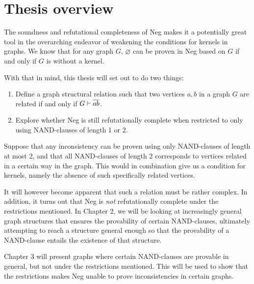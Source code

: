 \section{Thesis overview}
\label{sec:Thesis overview}
The soundness and refutational completeness of Neg makes it a potentially great tool in the overarching endeavor of weakening the conditions for kernels in graphs.
We know that for any graph $G$, $\varnothing$ can be proven in Neg based on $G$ if and only if $G$ is without a kernel.

With that in mind, this thesis will set out to do two things:
\begin{enumerate}
  \item Define a graph structural relation such that two vertices $a,b$ in a graph $G$ are related if and only if $G \vdash \ol{ab}$.
  \item Explore whether Neg is still refutationally complete when restricted to only using NAND-clauses of length 1 or 2.
\end{enumerate}
Suppose that any inconsistency can be proven using only NAND-clauses of length at most 2, and that all NAND-clauses of length 2 corresponds to vertices related in a certain way in the graph.
This would in combination give us a condition for kernels, namely the absence of such specifically related vertices.

It will however become apparent that such a relation must be rather complex.
In addition, it turns out that Neg is \textit{not} refutationally complete under the restrictions mentioned.
\label{sub:Thesis Overview}
In Chapter 2, we will be looking at increasingly general graph structures that ensures the provability of certain NAND-clauses, ultimately attempting to reach a structure general enough so that the provability of a NAND-clause entails the existence of that structure.

Chapter 3 will present graphs where certain NAND-clauses are provable in general, but not under the restrictions mentioned.
This will be used to show that the restrictions makes Neg unable to prove inconsistencies in certain graphs.
